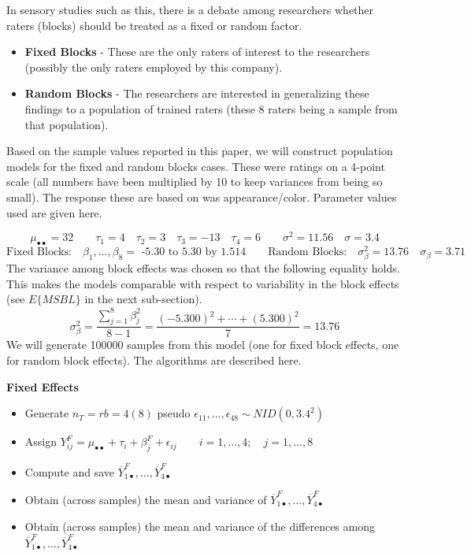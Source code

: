 \documentclass[
]{book}
\providecommand{\tightlist}{%
  \setlength{\itemsep}{0pt}\setlength{\parskip}{0pt}}
\begin{document}
In sensory studies such as this, there is a debate among researchers
whether raters (blocks) should be treated as a fixed or random factor.

\begin{itemize}
\tightlist
\item
  \textbf{Fixed Blocks} - These are the only raters of interest to the
  researchers (possibly the only raters employed by this company).
\item
  \textbf{Random Blocks} - The researchers are interested in
  generalizing these findings to a population of trained raters (these 8
  raters being a sample from that population).
\end{itemize}

Based on the sample values reported in this paper, we will construct
population models for the fixed and random blocks cases. These were
ratings on a 4-point scale (all numbers have been multiplied by 10 to
keep variances from being so small). The response these are based on was
appearance/color. Parameter values used are given here.

\[
\mu_{\bullet\bullet}=32 \qquad \tau_1=4 \quad \tau_2=3 \quad \tau_3=-13
\quad \tau_4=6  \qquad \sigma^2=11.56 \quad \sigma = 3.4
\] \[
\mbox{Fixed Blocks:} \quad \beta_1,\ldots, \beta_8 = \mbox{ -5.30 to 5.30 by 1.514} 
\qquad \mbox{Random Blocks:} \quad \sigma_{\beta}^2=13.76 \quad \sigma_{\beta}=3.71
\] The variance among block effects was chosen so that the following
equality holds. This makes the models comparable with respect to
variability in the block effects (see \(E\{MSBL\}\) in the next
sub-section). \[
\sigma_{\beta}^2 = \frac{\sum_{j=1}^8\beta_j^2}{8-1}=\frac{(-5.300)^2+\cdots+(5.300)^2}{7}=13.76
\] We will generate 100000 samples from this model (one for fixed block
effects, one for random block effects). The algorithms are described
here.

\textbf{Fixed Effects}

\begin{itemize}
\tightlist
\item
  Generate \(n_T=rb=4(8)\) pseudo
  \(\epsilon_{11}, \ldots , \epsilon_{48} \sim NID\left(0,3.4^2\right)\)
\item
  Assign
  \(Y_{ij}^F=\mu_{\bullet\bullet} + \tau_i + \beta_j^F + \epsilon_{ij} \qquad
   i=1,\ldots,4; \quad j=1,\ldots,8\)
\item
  Compute and save
  \(\overline{Y}_{1\bullet}^F,\ldots,\overline{Y}_{4\bullet}^F\)
\item
  Obtain (across samples) the mean and variance of
  \(\overline{Y}_{1\bullet}^F,\ldots,\overline{Y}_{4\bullet}^F\)
\item
  Obtain (across samples) the mean and variance of the differences among
  \(\overline{Y}_{1\bullet}^F,\ldots,\overline{Y}_{4\bullet}^F\)
\end{itemize}
\end{document}
